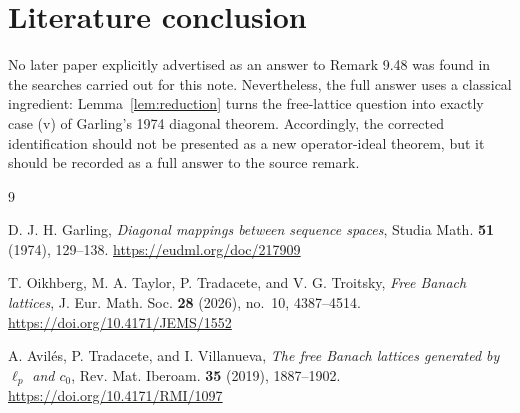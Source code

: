 \documentclass[11pt]{article}
\theoremstyle{remark}
\begin{document}
\section{Literature conclusion}

No later paper explicitly advertised as an answer to Remark 9.48 was found
in the searches carried out for this note.  Nevertheless, the full answer
uses a classical ingredient: Lemma~\ref{lem:reduction} turns the
free-lattice question into exactly case (v) of Garling's 1974 diagonal
theorem.  Accordingly, the corrected identification should not be presented
as a new operator-ideal theorem, but it should be recorded as a full answer
to the source remark.

\begin{thebibliography}{9}

D. J. H. Garling,
\emph{Diagonal mappings between sequence spaces},
Studia Math. \textbf{51} (1974), 129--138.
\url{https://eudml.org/doc/217909}

T. Oikhberg, M. A. Taylor, P. Tradacete, and V. G. Troitsky,
\emph{Free Banach lattices},
J. Eur. Math. Soc. \textbf{28} (2026), no.~10, 4387--4514.
\url{https://doi.org/10.4171/JEMS/1552}

A. Avil\'es, P. Tradacete, and I. Villanueva,
\emph{The free Banach lattices generated by $\ell_p$ and $c_0$},
Rev. Mat. Iberoam. \textbf{35} (2019), 1887--1902.
\url{https://doi.org/10.4171/RMI/1097}

\end{thebibliography}
\end{document}
